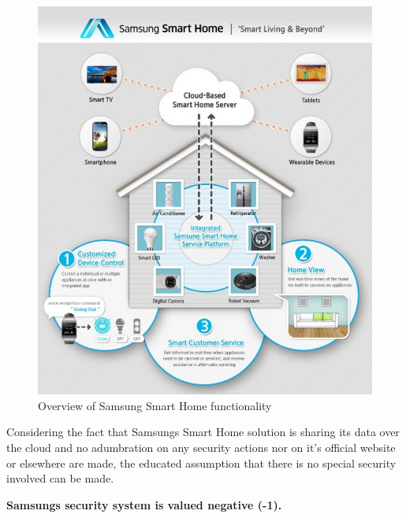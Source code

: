 				\begin{figure}[h]
					\centering
						\includegraphics[width=.9\textwidth]{images/theory/samsungSmarthome.jpg}
					\caption{Overview of Samsung Smart Home functionality}
					\label{fig:SmartHomeLandscape}
				\end{figure}

				Considering the fact that Samsungs Smart Home solution is sharing its data over the cloud and no adumbration on any security actions nor on it's official website or elsewhere are made, the educated assumption that there is no special security involved can be made. 

				\textbf{Samsungs security system is valued negative (-1).}\\

